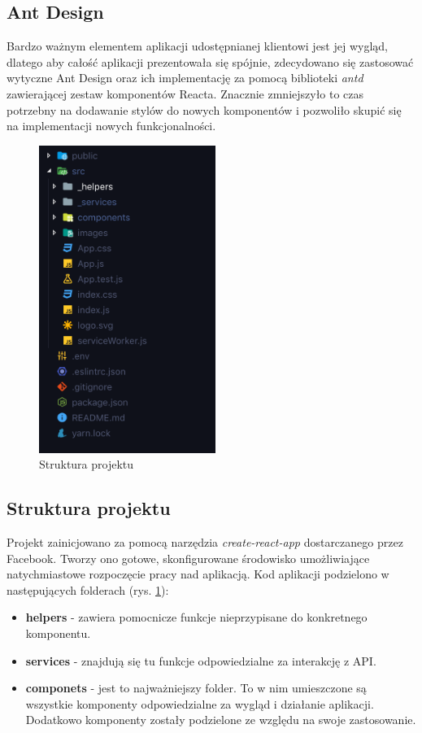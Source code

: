 \documentclass[declaration,shortabstract,polish,inz]{iithesis}
\begin{document}
\subsection{Ant Design}
Bardzo ważnym elementem aplikacji udostępnianej klientowi jest jej wygląd, dlatego aby całość aplikacji prezentowała się spójnie, zdecydowano się zastosować wytyczne Ant Design \cite{ant} oraz ich implementację za pomocą biblioteki \textit{antd} zawierającej zestaw komponentów Reacta. Znacznie zmniejszyło to czas potrzebny na dodawanie stylów do nowych komponentów i pozwoliło skupić się na implementacji nowych funkcjonalności.

\begin{figure}[H]
    \centering
    \includegraphics[height=10cm]{images/forontend.png}  
    \caption{Struktura projektu}
    \label{fig:frontend_struct}
\end{figure}
\subsection{Struktura projektu}
Projekt zainicjowano za pomocą narzędzia \textit{create-react-app} \cite{cra} dostarczanego przez Facebook. Tworzy ono gotowe, skonfigurowane środowisko umożliwiające natychmiastowe rozpoczęcie pracy nad aplikacją. Kod aplikacji podzielono w następujących folderach (rys. \ref{fig:frontend_struct}):
\begin{itemize}
    \item \textbf{\textunderscore helpers} - zawiera pomocnicze funkcje nieprzypisane do konkretnego komponentu.
    \item \textbf{\textunderscore services} - znajdują się tu funkcje odpowiedzialne za interakcję z API.
    \item \textbf{componets} - jest to najważniejszy folder. To w nim umieszczone są wszystkie komponenty odpowiedzialne za wygląd i działanie aplikacji. Dodatkowo komponenty zostały podzielone ze względu na swoje zastosowanie.
\end{itemize}
\end{document}
